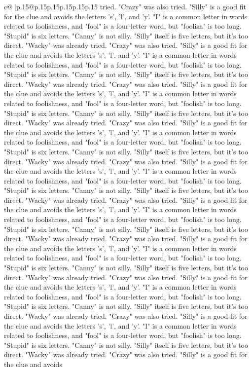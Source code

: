 \documentclass{article}
\begin{document}
{\begin{supertabular}{c@{$\;$}|p{.15\linewidth}@{}p{.15\linewidth}p{.15\linewidth}p{.15\linewidth}p{.15\linewidth}p{.15\linewidth}}
{{{tried. "Crazy" was also tried. "Silly" is a good fit for the clue and avoids the letters 's', 'l', and 'y'. "I" is a common letter in words related to foolishness, and "fool" is a four{-}letter word, but "foolish" is too long. "Stupid" is six letters. "Canny" is not silly. "Silly" itself is five letters, but it's too direct. "Wacky" was already tried. "Crazy" was also tried. "Silly" is a good fit for the clue and avoids the letters 's', 'l', and 'y'. "I" is a common letter in words related to foolishness, and "fool" is a four{-}letter word, but "foolish" is too long. "Stupid" is six letters. "Canny" is not silly. "Silly" itself is five letters, but it's too direct. "Wacky" was already tried. "Crazy" was also tried. "Silly" is a good fit for the clue and avoids the letters 's', 'l', and 'y'. "I" is a common letter in words related to foolishness, and "fool" is a four{-}letter word, but "foolish" is too long. "Stupid" is six letters. "Canny" is not silly. "Silly" itself is five letters, but it's too direct. "Wacky" was already tried. "Crazy" was also tried. "Silly" is a good fit for the clue and avoids the letters 's', 'l', and 'y'. "I" is a common letter in words related to foolishness, and "fool" is a four{-}letter word, but "foolish" is too long. "Stupid" is six letters. "Canny" is not silly. "Silly" itself is five letters, but it's too direct. "Wacky" was already tried. "Crazy" was also tried. "Silly" is a good fit for the clue and avoids the letters 's', 'l', and 'y'. "I" is a common letter in words related to foolishness, and "fool" is a four{-}letter word, but "foolish" is too long. "Stupid" is six letters. "Canny" is not silly. "Silly" itself is five letters, but it's too direct. "Wacky" was already tried. "Crazy" was also tried. "Silly" is a good fit for the clue and avoids the letters 's', 'l', and 'y'. "I" is a common letter in words related to foolishness, and "fool" is a four{-}letter word, but "foolish" is too long. "Stupid" is six letters. "Canny" is not silly. "Silly" itself is five letters, but it's too direct. "Wacky" was already tried. "Crazy" was also tried. "Silly" is a good fit for the clue and avoids the letters 's', 'l', and 'y'. "I" is a common letter in words related to foolishness, and "fool" is a four{-}letter word, but "foolish" is too long. "Stupid" is six letters. "Canny" is not silly. "Silly" itself is five letters, but it's too direct. "Wacky" was already tried. "Crazy" was also tried. "Silly" is a good fit for the clue and avoids the letters 's', 'l', and 'y'. "I" is a common letter in words related to foolishness, and "fool" is a four{-}letter word, but "foolish" is too long. "Stupid" is six letters. "Canny" is not silly. "Silly" itself is five letters, but it's too direct. "Wacky" was already tried. "Crazy" was also tried. "Silly" is a good fit for the clue and avoids the letters 's', 'l', and 'y'. "I" is a common letter in words related to foolishness, and "fool" is a four{-}letter word, but "foolish" is too long. "Stupid" is six letters. "Canny" is not silly. "Silly" itself is five letters, but it's too direct. "Wacky" was already tried. "Crazy" was also tried. "Silly" is a good fit for the clue and avoids }}}
\end{supertabular}}
\end{document}
